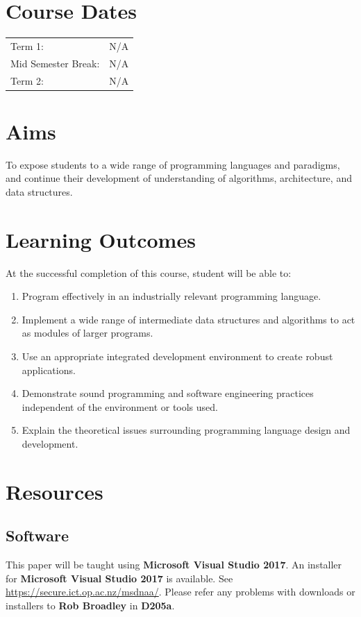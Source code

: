 \documentclass{article}
\begin{document}
\section*{Course Dates}
\begin{tabular}{ll}
  Term 1:             & N/A \\
  Mid Semester Break: & N/A \\
  Term 2:             & N/A \\
\end{tabular}

\section*{Aims}
To expose students to a wide range of programming languages and paradigms, and continue their development of understanding of algorithms, architecture, and data structures.

\section*{Learning Outcomes}
At the successful completion of this course, student will be able to:
\begin{enumerate}
  \item Program effectively in an industrially relevant programming language.
  \item Implement a wide range of intermediate data structures and algorithms to act as modules of larger programs.
  \item Use an appropriate integrated development environment to create robust applications.
  \item Demonstrate sound programming and software engineering practices independent of the environment or tools used.
  \item Explain the theoretical issues surrounding programming language design and development.
\end{enumerate}

\section*{Resources}

\subsection*{Software}
This paper will be taught using \textbf{Microsoft Visual Studio 2017}. An installer for \textbf{Microsoft Visual Studio 2017} is available. See \href{https://secure.ict.op.ac.nz/msdnaa/}{https://secure.ict.op.ac.nz/msdnaa/}. Please refer any problems with downloads or installers to \textbf{Rob Broadley} in \textbf{D205a}.
\end{document}
